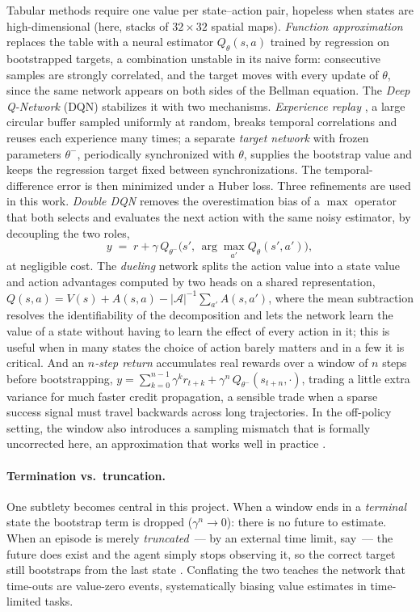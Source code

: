 Tabular methods require one value per state--action pair, hopeless when states
are high-dimensional (here, stacks of $32\times32$ spatial maps).
\emph{Function approximation} replaces the table with a neural estimator
$Q_\theta(s,a)$ trained by regression on bootstrapped targets, a combination
unstable in its naive form: consecutive samples are strongly correlated, and the
target moves with every update of $\theta$, since the same network appears on
both sides of the Bellman equation. The \emph{Deep Q-Network} (DQN)
\citep{mnih2015human} stabilizes it with two mechanisms. \emph{Experience replay}
\citep{lin1992self}, a large circular buffer sampled uniformly at random, breaks
temporal correlations and reuses each experience many times; a separate
\emph{target network} with frozen parameters $\theta^-$, periodically
synchronized with $\theta$, supplies the bootstrap value and keeps the regression
target fixed between synchronizations. The temporal-difference error is then
minimized under a Huber loss. Three refinements are used in this work.
\emph{Double DQN} \citep{vanhasselt2016double} removes the overestimation bias of
a $\max$ operator that both selects and evaluates the next action with the same
noisy estimator, by decoupling the two roles,
\[
y \;=\; r + \gamma\, Q_{\theta^-}\bigl(s',\,
\arg\max_{a'} Q_{\theta}(s', a')\bigr),
\]
at negligible cost. The \emph{dueling} network \citep{wang2016dueling} splits the
action value into a state value and action advantages computed by two heads on a
shared representation, $Q(s,a) = V(s) + A(s,a) - |\mathcal{A}|^{-1}\sum_{a'}
A(s,a')$, where the mean subtraction resolves the identifiability of the
decomposition and lets the network learn the value of a state without having to
learn the effect of every action in it; this is useful when in many states the
choice of action barely matters and in a few it is critical. And an
\emph{$n$-step return} accumulates real rewards over a window of $n$ steps before
bootstrapping,
$y = \sum_{k=0}^{n-1} \gamma^k r_{t+k} + \gamma^n\, Q_{\theta^-}(s_{t+n},\cdot)$,
trading a little extra variance for much faster credit propagation, a sensible
trade when a sparse success signal must travel backwards across long
trajectories. In the off-policy setting, the window also introduces a sampling mismatch that is
formally uncorrected here, an approximation that works well in practice
\citep{hessel2018rainbow}.

\paragraph{Termination vs.\ truncation.}
One subtlety becomes central in this project. When a window ends in a
\emph{terminal} state the bootstrap term is dropped ($\gamma^n \to 0$): there is
no future to estimate. When an episode is merely \emph{truncated}~--- by an
external time limit, say~--- the future does exist and the agent simply stops
observing it, so
the correct target still bootstraps from the last state \citep{pardo2018time}.
Conflating the two teaches the network that time-outs are value-zero events,
systematically biasing value estimates in time-limited tasks.

